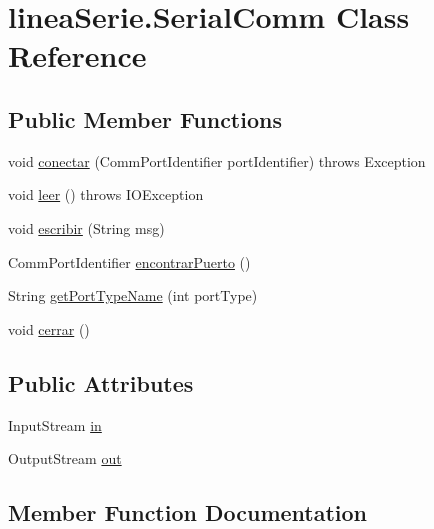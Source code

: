 \hypertarget{classlinea_serie_1_1_serial_comm}{}\section{linea\+Serie.\+Serial\+Comm Class Reference}
\label{classlinea_serie_1_1_serial_comm}
\subsection*{Public Member Functions}
\begin{DoxyCompactItemize}
\item 
void \mbox{\hyperlink{classlinea_serie_1_1_serial_comm_a119765abd1757084440494ae31d8f759}{conectar}} (Comm\+Port\+Identifier port\+Identifier)  throws Exception     
\item 
void \mbox{\hyperlink{classlinea_serie_1_1_serial_comm_aeb7baedd9a1e366b0f90a0ba72927696}{leer}} ()  throws I\+O\+Exception     
\item 
void \mbox{\hyperlink{classlinea_serie_1_1_serial_comm_a4f5abedd2317e8d668581b99107b9736}{escribir}} (String msg)
\item 
Comm\+Port\+Identifier \mbox{\hyperlink{classlinea_serie_1_1_serial_comm_a50a2b225a3ba6b5dd7e8dee5b6ba47f5}{encontrar\+Puerto}} ()
\item 
String \mbox{\hyperlink{classlinea_serie_1_1_serial_comm_ac0d967d32882e8c3bc23ebc1810190e8}{get\+Port\+Type\+Name}} (int port\+Type)
\item 
void \mbox{\hyperlink{classlinea_serie_1_1_serial_comm_ad18c167939926da33cd2b6cd153f036a}{cerrar}} ()
\end{DoxyCompactItemize}
\subsection*{Public Attributes}
\begin{DoxyCompactItemize}
\item 
Input\+Stream \mbox{\hyperlink{classlinea_serie_1_1_serial_comm_abca21dcc1d4f5a2e5e49af41e37552d3}{in}}
\item 
Output\+Stream \mbox{\hyperlink{classlinea_serie_1_1_serial_comm_a26da908a9338f21051edcee4fb86a3ad}{out}}
\end{DoxyCompactItemize}


\subsection{Member Function Documentation}
\mbox{\label{classlinea_serie_1_1_serial_comm_ad18c167939926da33cd2b6cd153f036a}} 
